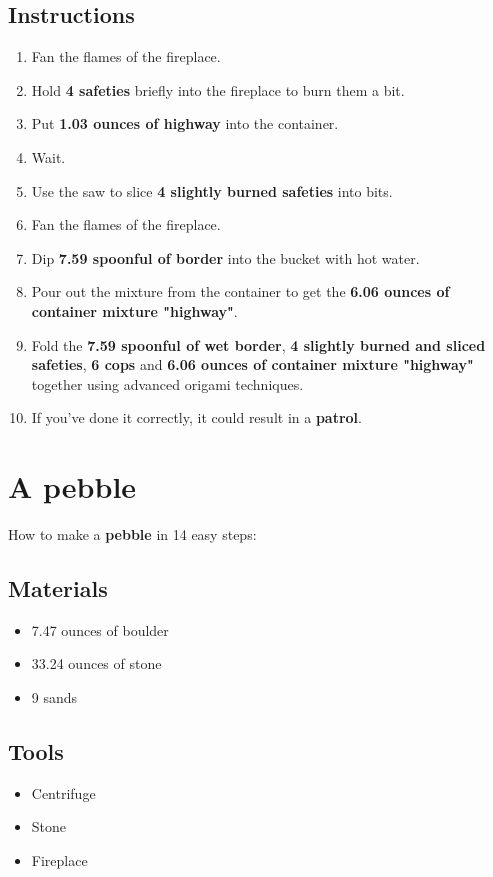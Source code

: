 \documentclass{article}
\begin{document}
\subsection{Instructions}\begin{enumerate}
\item 
Fan the flames of the fireplace.
\item 
Hold \textbf{4 safeties} briefly into the fireplace to burn them a bit.
\item 
Put \textbf{1.03 ounces of highway} into the container.
\item 
Wait.
\item 
Use the saw to slice \textbf{4 slightly burned safeties} into bits.
\item 
Fan the flames of the fireplace.
\item 
Dip \textbf{7.59 spoonful of border} into the bucket with hot water.
\item 
Pour out the mixture from the container to get the \textbf{6.06 ounces of container mixture "highway"}.
\item 
Fold the \textbf{7.59 spoonful of wet border}, \textbf{4 slightly burned and sliced safeties}, \textbf{6 cops} and \textbf{6.06 ounces of container mixture "highway"} together using advanced origami techniques.
\item 
If you've done it correctly, it could result in a \textbf{patrol}.
\end{enumerate}
\newpage
\section{A pebble}How to make a \textbf{pebble} in 14 easy steps:

\subsection{Materials}\begin{itemize}
\item 
7.47 ounces of boulder
\item 
33.24 ounces of stone
\item 
9 sands
\end{itemize}
\subsection{Tools}\begin{itemize}
\item 
Centrifuge
\item 
Stone
\item 
Fireplace
\end{itemize}
\end{document}
